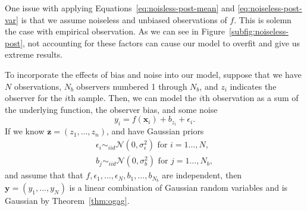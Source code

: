 One issue with applying Equations~\ref{eq:noisless-post-mean} and \ref{eq:noiseless-post-var} is that we assume noiseless and unbiased observations of $f$.
This is solemn the case with empirical observation.
As we can see in Figure~\ref{subfig:noiseless-post}, not accounting for these factors can cause our model to overfit and give us extreme results.

To incorporate the effects of bias and noise into our model, suppose that we have $N$ observations, $N_b$ observers numbered 1 through $N_b$, and $z_i$ indicates the observer for the $i$th sample.
Then, we can model the $i$th observation as a sum of the underlying function, the observer bias, and some noise
\begin{equation*}
    y_i = f(\mathbf{x}_i) + b_{z_i} + \epsilon_i.
\end{equation*}
If we know $\mathbf{z} = (z_1, \dots, z_n)$, and have Gaussian priors
\begin{align*}
    \epsilon_i \sim_{iid} \mathcal{N}(0, \sigma^2_{\epsilon}) \text{ for $i = 1 \dots, N$}, \\
    b_j \sim_{iid} \mathcal{N}(0, \sigma_{b}^2) \text{ for $j = 1 \dots, N_b$},
\end{align*}
and assume that that $f, \epsilon_1, \dots, \epsilon_N, b_1, \dots, b_{N_b}$ are independent,
then $\mathbf{y} = (y_1, \dots, y_N)$ is a linear combination of Gaussian random variables
and is Gaussian by Theorem~\ref{thm:ogag}.

